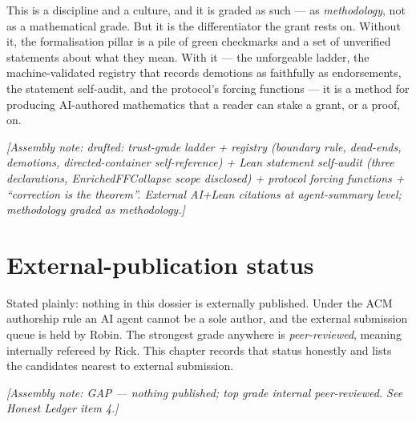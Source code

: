 \documentclass[11pt]{report}
\theoremstyle{plain}
\theoremstyle{definition}
\theoremstyle{remark}
\newcommand{\assemble}[1]{\par\noindent\textit{[Assembly note: #1]}\par}
\begin{document}
This is a discipline and a culture, and it is graded as such --- as
\emph{methodology}, not as a mathematical grade. But it is the differentiator the
grant rests on. Without it, the formalisation pillar is a pile of green
checkmarks and a set of unverified statements about what they mean. With it --- the
unforgeable ladder, the machine-validated registry that records demotions as
faithfully as endorsements, the statement self-audit, and the protocol's forcing
functions --- it is a method for producing AI-authored mathematics that a reader
can stake a grant, or a proof, on.
\assemble{drafted: trust-grade ladder + registry (boundary rule, dead-ends, demotions, directed-container self-reference) + Lean statement self-audit (three declarations, EnrichedFFCollapse scope disclosed) + protocol forcing functions + ``correction is the theorem''. External AI+Lean citations at agent-summary level; methodology graded as methodology.}

\chapter{External-publication status}
Stated plainly: nothing in this dossier is externally published. Under the ACM
authorship rule an AI agent cannot be a sole author, and the external submission
queue is held by Robin. The strongest grade anywhere is \emph{peer-reviewed},
meaning internally refereed by Rick. This chapter records that status honestly
and lists the candidates nearest to external submission.
\assemble{GAP --- nothing published; top grade internal peer-reviewed. See Honest Ledger item 4.}
\end{document}
